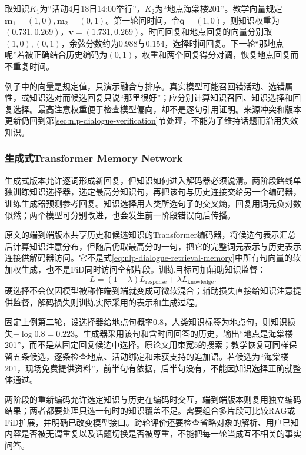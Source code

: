 取知识$K_1$为“活动4月18日14:00举行”，$K_2$为“地点海棠楼201”。教学向量规定$\bm{m}_1=(1,0),\bm{m}_2=(0,1)$。第一轮问时间，令$\bm{q}=(1,0)$，则知识权重为$(0.731,0.269)$，$\bm{v}=(1.731,0.269)$。时间回复和地点回复的向量分别取$(1,0),(0,1)$，余弦分数约为0.988与0.154，选择时间回复。下一轮“那地点呢”若被正确结合历史编码为$(0,1)$，权重和两个回复得分对调，恢复地点回复而不重复时间。

例子中的向量是规定值，只演示融合与排序。真实模型可能召回错活动、选错属性，或知识选对而候选回复只说“那里很好”；应分别计算知识召回、知识选择和回复选择。最高注意权重便于检查模型偏向，却不是逐句引用证明。来源冲突和版本更新仍回到第\ref{sec:nlp-dialogue-verification}节处理，不能为了维持话题而沿用失效知识。

\subsubsection{生成式Transformer Memory Network}
\label{sec:nlp-dialogue-generative-memory}

生成式版本允许逐词形成新回复，但知识如何进入解码器必须说清。两阶段路线单独训练知识选择器，选定最高分知识句，再把该句与历史连接交给另一个编码器，训练生成器预测参考回复。知识选择用人类所选句子的交叉熵，回复用词元负对数似然；两个模型可分别改进，也会发生前一阶段错误向后传播。

原文的端到端版本共享历史和候选知识的Transformer编码器，将候选句表示汇总后计算知识注意分布，但随后仍取最高分的一句，把它的完整词元表示与历史表示连接供解码器访问。它不是式\eqref{eq:nlp-dialogue-retrieval-memory}中所有句向量的软加权生成，也不是FiD同时访问全部片段。训练目标可加辅助知识监督：
\begin{equation}
 L=(1-\lambda)L_{\mathrm{response}}+\lambda L_{\mathrm{knowledge}}.
 \label{eq:nlp-dialogue-generative-memory}
\end{equation}
硬选择不会仅因模型被称作端到端就变成可微软混合；辅助损失直接给知识注意提供监督，解码损失则训练实际采用的表示和生成过程。

固定上例第二轮，设选择器给地点句概率0.8，人类知识标签为地点句，则知识损失$-\log0.8=0.223$。生成器采用该句和含时间回答的历史，输出“地点是海棠楼201”，而不是从固定回复候选中选择。原论文用束宽5的搜索；教学恢复可同样保留五条候选，逐条检查地点、活动绑定和未获支持的追加语。若候选为“海棠楼201，现场免费提供资料”，前半句有依据，后半句没有，不能因知识选择正确就整体通过。

两阶段的重新编码允许选定知识与历史在编码时交互，端到端版本则复用独立编码结果；两者都要处理只选一句时的知识覆盖不足。需要组合多片段可比较RAG或FiD扩展，并明确已改变模型接口。跨轮评价还要检查省略对象的解析、用户已知内容是否被无谓重复以及话题切换是否被尊重，不能把每一轮当成互不相关的事实问答。

